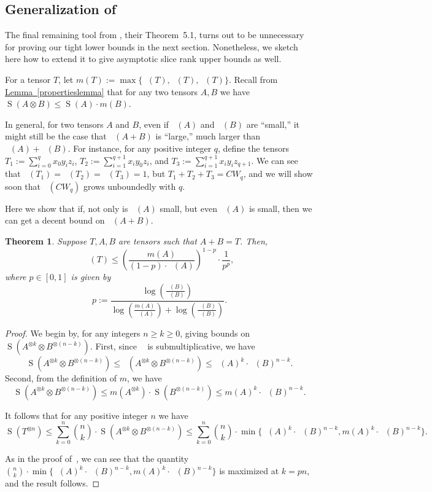 \documentclass[11pt]{article}
\numberwithin{equation}{section}
\newtheorem{theorem}{Theorem}[section]
\theoremstyle{definition}
\theoremstyle{plain}
\newcommand{\expref}[2]{\hyperref[#2]{#1~\ref{#2}}}
\newcommand{\sr}{\mathop{\operatorname{S}}}
\newcommand{\xr}{\mathop{\operatorname{S_x}}}
\newcommand{\yr}{\mathop{\operatorname{S_y}}}
\newcommand{\zr}{\mathop{\operatorname{S_z}}}
\newcommand{\tsr}{\mathop{\tilde{\operatorname{S}}}}
\theoremstyle{definition}
\begin{document}
\subsection{Generalization of \cite[Theorem~5.1]{aw}}
The final remaining tool from \cite{aw}, their Theorem~5.1, turns out to be unnecessary for proving our tight lower bounds in the next section. Nonetheless, we sketch here how to extend it to give asymptotic slice rank upper bounds as well.

For a tensor $T$, let $m(T) := \max \{ \xr(T), \yr(T), \zr(T) \}$. Recall from \expref{Lemma}{propertieslemma} that for any two tensors $A,B$ we have $\sr(A \otimes B) \leq \sr(A) \cdot m(B)$.

In general, for two tensors $A$ and $B$, even if $\tsr(A)$ and  $\tsr(B)$ are ``small,'' it might still be the case that $\tsr(A+B)$ is ``large,'' much larger than $\tsr(A) + \tsr(B)$. For instance, for any positive integer $q$, define the tensors $T_1 := \sum_{i=0}^q x_0 y_i z_i$, $T_2 := \sum_{i=1}^{q+1} x_i y_0 z_i$, and $T_3 := \sum_{i=1}^{q+1} x_i y_i z_{q+1}$. We can see that $\tsr(T_1) = \tsr(T_2) = \tsr(T_3) = 1$, but $T_1 + T_2 + T_3 = CW_{q}$, and we will show soon that $\tsr(CW_q)$ grows unboundedly with $q$.

Here we show that if, not only is $\tsr(A)$ small, but even $\xr(A)$ is small, then we can get a decent bound on  $\tsr(A+B)$.

\begin{theorem} \label{removeanxtool}
Suppose $T,A,B$ are tensors such that $A + B = T$. Then,
$$\tsr(T) \leq \left( \frac{m(A)}{(1-p) \cdot \xr(A)} \right)^{1-p} \cdot \frac{1}{p^p},$$
where $p \in [0,1]$ is given by
$$p := \frac{\log\left( \frac{\xr(B)}{\tsr(B)} \right)}{ \log\left(\frac{m(A)}{\xr(A)}\right) + \log\left(\frac{\xr(B)}{\tsr(B)}\right)}.$$
\end{theorem}

\begin{proof}
We begin by, for any integers $n \geq k \geq 0$, giving bounds on $\sr(A^{\otimes k} \otimes B^{\otimes (n-k)})$. First, since $\xr$ is submultiplicative, we have $$\sr(A^{\otimes k} \otimes B^{\otimes (n-k)}) \leq \xr(A^{\otimes k} \otimes B^{\otimes (n-k)}) \leq \xr(A)^k \cdot \xr(B)^{n-k}.$$
Second, from the definition of $m$, we have $$\sr(A^{\otimes k} \otimes B^{\otimes (n-k)}) \leq m(A^{\otimes k}) \cdot \sr(B^{\otimes (n-k)})  \leq m(A)^k \cdot \tsr(B)^{n-k}.$$

It follows that for any positive integer $n$ we have
$$\sr(T^{\otimes n}) \leq \sum_{k=0}^n \binom{n}{k} \cdot \sr(A^{\otimes k} \otimes B^{\otimes (n-k)}) \leq \sum_{k=0}^n \binom{n}{k} \cdot \min \{ \xr(A)^k \cdot \xr(B)^{n-k}, m(A)^k \cdot \tsr(B)^{n-k} \}.$$

As in the proof of~\cite[Theorem~5.1]{aw}, we can see that the quantity $\binom{n}{k} \cdot \min \{ \xr(A)^k \cdot \xr(B)^{n-k}, m(A)^k \cdot \tsr(B)^{n-k} \}$ is maximized at $k = pn$, and the result follows.
\end{proof}
\end{document}
